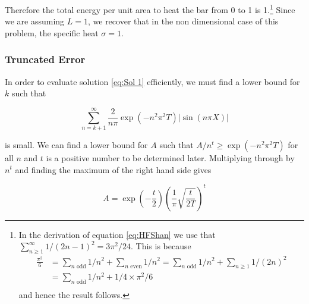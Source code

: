 \documentclass[10pt,a4paper,notitlepage]{article}
\newcommand{\abs}[1]{\lvert#1\rvert}
\begin{document}
Therefore the total energy per unit area to heat the bar from 0 to 1 is 1.\footnote{In the derivation of equation \eqref{eq:HFShan} we use that $\sum_{n\geq 1}^{\infty}1/(2n-1)^{2}=3\pi^2/24$. This is because
\begin{equation}
\begin{aligned}
\frac{\pi^{2}}{6} &=\sum_{n \text{ odd}}1/n^2+\sum_{n \text{ even}}1/n^2 = \sum_{n \text{ odd}}1/n^2 + \sum_{n\geq 1}1/(2n)^2\\ 
&= \sum_{n \text{ odd}}1/n^2 + 1/4 \times \pi^2/6\\
\end{aligned}
\end{equation}
and hence the result follows.
} Since we are assuming $L=1$, we recover that in the non dimensional case of this problem,  the specific heat $\sigma =1$.

\subsubsection*{\centering Truncated Error}\label{subsec:Truncated Error}
In order to evaluate solution \eqref{eq:Sol 1} efficiently, we must find a lower bound for $k$ such that

\begin{equation} \label{eq:Small Error 1}
\sum_{n=k+1}^{\infty}\frac{2}{n\pi}\exp\left(-n^{2}\pi^{2}T\right)\abs{\sin\left(n\pi X\right)}
\end{equation}

is small.  We can find a lower bound for $A$ such that $A/n^{t}\geq \exp(-n^{2}\pi^{2}T)$ for all $n$ and $t$ is a positive number to be determined later.  Multiplying through by $n^{t}$ and finding the maximum of the right hand side gives

\begin{equation}
A=\exp\left(-\frac{t}{2}\right)\left(\frac{1}{\pi}\sqrt{\frac{t}{2T}}\right)^{t}
\end{equation}
\end{document}
